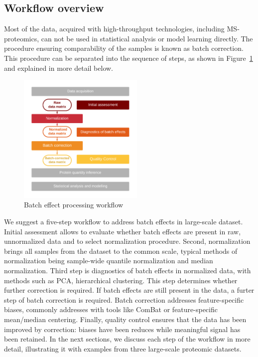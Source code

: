 \documentclass[num-refs]{wiley-article}
\begin{document}
\subsection{Workflow overview}
Most of the data, acquired with high-throughput technologies, including MS-proteomics, can not be used in statistical analysis or model learning directly. The procedure ensuring comparability of the samples is known as batch correction. This procedure can be separated into the sequence of steps, as shown in Figure~\ref{fig:batch_fig1_workflow} and explained in more detail below.  
\begin{figure}[bt]
	\center
	\includegraphics[width=6cm]{figures/Fig0_workflow_staircase}
	\caption[Batch effect correction workflow]
	{Batch effect processing workflow}
	\label{fig:batch_fig1_workflow}
\end{figure}

We suggest a five-step workflow to address batch effects in large-scale dataset. Initial assessment allows to evaluate whether batch effects are present in raw, unnormalized data and to select normalization procedure. Second, normalization brings all samples from the dataset to the common scale, typical methods of normalization being sample-wide quantile normalization and median normalization. Third step is diagnostics of batch effects in normalized data, with methods such as PCA, hierarchical clustering. This step determines whether further correction is required. If batch effects are still present in the data, a furter step of batch correction is required. Batch correction addresses feature-specific biases, commonly addresses with tools like ComBat \cite{Johnson:2007aa} or feature-specific mean/median centering. Finally, quality control ensures that the data has been improved by correction: biases have been reduces while meaningful signal has been retained. In the next sections, we discuss each step of the workflow in more detail, illustrating it with examples from three large-scale proteomic datasets.
\end{document}
